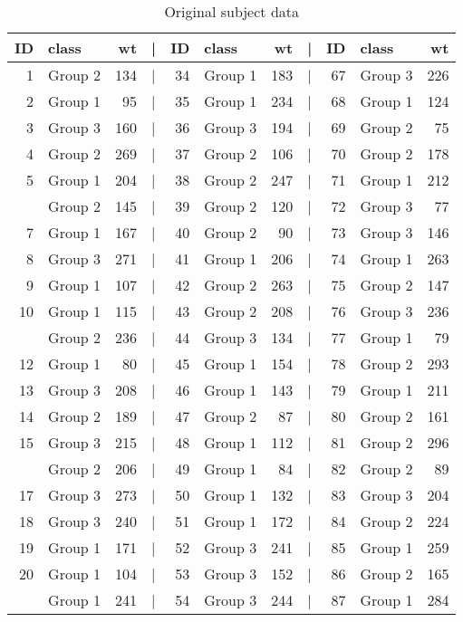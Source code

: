 \documentclass[smallextended]{svjour3}       %
\begin{document}
\begin{table}
\caption{\label{tab:subject-weights}Original subject data}
\centering
\begin{tabular}[t]{rlrlrlrlrlr}
\toprule
ID & class & wt & | & ID & class & wt & | & ID & class & wt\\
\midrule
1 & Group 2 & 134 & | & 34 & Group 1 & 183 & | & 67 & Group 3 & 226\\
2 & Group 1 & 95 & | & 35 & Group 1 & 234 & | & 68 & Group 1 & 124\\
3 & Group 3 & 160 & | & 36 & Group 3 & 194 & | & 69 & Group 2 & 75\\
4 & Group 2 & 269 & | & 37 & Group 2 & 106 & | & 70 & Group 2 & 178\\
5 & Group 1 & 204 & | & 38 & Group 2 & 247 & | & 71 & Group 1 & 212\\
\addlinespace
6 & Group 2 & 145 & | & 39 & Group 2 & 120 & | & 72 & Group 3 & 77\\
7 & Group 1 & 167 & | & 40 & Group 2 & 90 & | & 73 & Group 3 & 146\\
8 & Group 3 & 271 & | & 41 & Group 1 & 206 & | & 74 & Group 1 & 263\\
9 & Group 1 & 107 & | & 42 & Group 2 & 263 & | & 75 & Group 2 & 147\\
10 & Group 1 & 115 & | & 43 & Group 2 & 208 & | & 76 & Group 3 & 236\\
\addlinespace
11 & Group 2 & 236 & | & 44 & Group 3 & 134 & | & 77 & Group 1 & 79\\
12 & Group 1 & 80 & | & 45 & Group 1 & 154 & | & 78 & Group 2 & 293\\
13 & Group 3 & 208 & | & 46 & Group 1 & 143 & | & 79 & Group 1 & 211\\
14 & Group 2 & 189 & | & 47 & Group 2 & 87 & | & 80 & Group 2 & 161\\
15 & Group 3 & 215 & | & 48 & Group 1 & 112 & | & 81 & Group 2 & 296\\
\addlinespace
16 & Group 2 & 206 & | & 49 & Group 1 & 84 & | & 82 & Group 2 & 89\\
17 & Group 3 & 273 & | & 50 & Group 1 & 132 & | & 83 & Group 3 & 204\\
18 & Group 3 & 240 & | & 51 & Group 1 & 172 & | & 84 & Group 2 & 224\\
19 & Group 1 & 171 & | & 52 & Group 3 & 241 & | & 85 & Group 1 & 259\\
20 & Group 1 & 104 & | & 53 & Group 3 & 152 & | & 86 & Group 2 & 165\\
\addlinespace
21 & Group 1 & 241 & | & 54 & Group 3 & 244 & | & 87 & Group 1 & 284\\

\end{tabular}
\end{table}
\end{document}
